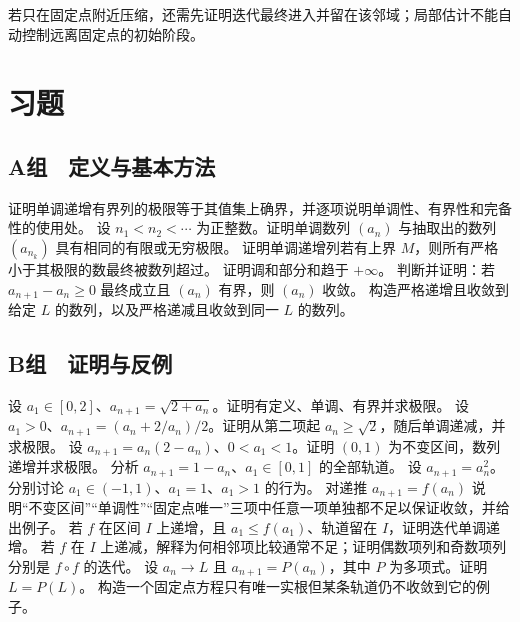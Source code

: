 若只在固定点附近压缩，还需先证明迭代最终进入并留在该邻域；局部估计不能自动控制远离固定点的初始阶段。

\section*{习题}

\subsection*{A组　定义与基本方法}
\begin{enumerate}[label=\textbf{\thechapter.\arabic*.}]
  证明单调递增有界列的极限等于其值集上确界，并逐项说明单调性、有界性和完备性的使用处。
  设 \(n_1<n_2<\cdots\) 为正整数。证明单调数列
 \((a_n)\) 与抽取出的数列 \((a_{n_k})\) 具有相同的有限或无穷极限。
  证明单调递增列若有上界 \(M\)，则所有严格小于其极限的数最终被数列超过。
  证明调和部分和趋于 \(+\infty\)。
  判断并证明：若 \(a_{n+1}-a_n\ge0\) 最终成立且 \((a_n)\) 有界，则 \((a_n)\) 收敛。
  构造严格递增且收敛到给定 \(L\) 的数列，以及严格递减且收敛到同一 \(L\) 的数列。
\end{enumerate}

\subsection*{B组　证明与反例}
\begin{enumerate}[label=\textbf{\thechapter.\arabic*.},resume]
  设 \(a_1\in[0,2]\)、\(a_{n+1}=\sqrt{2+a_n}\)。证明有定义、单调、有界并求极限。
  设 \(a_1>0\)、\(a_{n+1}=(a_n+2/a_n)/2\)。证明从第二项起 \(a_n\ge\sqrt2\)，随后单调递减，并求极限。
  设 \(a_{n+1}=a_n(2-a_n)\)、\(0<a_1<1\)。证明 \((0,1)\) 为不变区间，数列递增并求极限。
  分析 \(a_{n+1}=1-a_n\)、\(a_1\in[0,1]\) 的全部轨道。
  设 \(a_{n+1}=a_n^2\)。分别讨论 \(a_1\in(-1,1)\)、\(a_1=1\)、\(a_1>1\) 的行为。
  对递推 \(a_{n+1}=f(a_n)\) 说明“不变区间”“单调性”“固定点唯一”三项中任意一项单独都不足以保证收敛，并给出例子。
  若 \(f\) 在区间 \(I\) 上递增，且 \(a_1\le f(a_1)\)、轨道留在 \(I\)，证明迭代单调递增。
  若 \(f\) 在 \(I\) 上递减，解释为何相邻项比较通常不足；证明偶数项列和奇数项列分别是 \(f\circ f\) 的迭代。
  设 \(a_n\to L\) 且 \(a_{n+1}=P(a_n)\)，其中 \(P\) 为多项式。证明 \(L=P(L)\)。
  构造一个固定点方程只有唯一实根但某条轨道仍不收敛到它的例子。
\end{enumerate}

